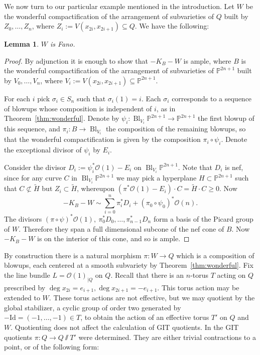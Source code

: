 \documentclass{amsart}
\newtheorem{lemma}[theorem]{Lemma}
\theoremstyle{definition}
\newcommand{\PP}{\mathbb{P}}
\DeclareMathOperator{\Bl}{Bl}
\begin{document}
We now turn to our particular example mentioned in the introduction. Let \(W\) be the wonderful compactification of the arrangement of subvarieties of \(Q\) built by \(Z_0,\dots,Z_n\), where \(Z_i := V(x_{2i},x_{2i+1}) \subseteq Q\). We have the following:
\begin{lemma}
\(W\) is Fano.
\end{lemma}
\begin{proof}
By adjunction it is enough to show that \(-K_B - W\) is ample, where \(B\) is the wonderful compactification of the arrangement of subvarieties of \(\PP^{2n+1}\) built by \(V_0,\dots,V_n\), where \(V_i := V(x_{2i},x_{2i+1}) \subseteq \PP^{2n+1}\).

For each \(i\) pick \(\sigma_i \in S_n\) such that \(\sigma_i(1) = i\). Each \(\sigma_i\) corresponds to a sequence of blowups whose composition is independent of \(i\), as in Theorem~\ref{thm:wonderful}. Denote by \( \psi_i: \Bl_{V_i} \PP^{2n+1} \to \PP^{2n+1}\) the first blowup of this sequence, and \(\pi_i: B \to \Bl_{V_i}\) the composition of the remaining blowups, so that the wonderful compactification is given by the composition \(\pi_i \circ \psi_i\). Denote the exceptional divisor of \(\psi_i\) by \(E_i\).

Consider the divisor \(D_i := \psi_i^* \mathcal{O}(1) - E_i\) on \(\Bl_{V_i} \PP^{2n+1}\). Note that \(D_i\) is nef, since for any curve \(C\) in \(\Bl_{V_i} \PP^{2n+1}\) we may pick a hyperplane \(H \subset \PP^{2n+1} \) such that \(C \not\subset \tilde{H}\) but \(Z_i \subset \tilde{H}\), whereupon \((\pi^* \mathcal{O}(1) - E_i) \cdot C = \tilde{H} \cdot C \ge 0\).
Now
\[
-K_B - W \sim  \sum_{i=0}^{n} \pi_i^* D_i + (\pi_0 \circ \psi_0)^* \mathcal{O}(n).
\]
The divisors \((\pi \circ \psi)^* \mathcal{O}(1), \ \pi_0^* D_0, \dots, \pi_{n-1}^* D_{n} \) form a basis of the Picard group of \(W\). Therefore they span a full dimensional subcone of the nef cone of \(B\). Now \(-K_B - W\) is on the interior of this cone, and so is ample.
\end{proof}
By construction there is a natural morphism \(\pi: W \to Q\) which is a composition of blowups, each centered at a smooth subvariety by Theorem~\ref{thm:wonderful}. Fix the line bundle \(L = \mathcal{O}(1)_{|Q} \) on \(Q\). Recall that there is an \(n\)-torus \(T\) acting on \(Q\) prescribed by \(\deg x_{2i} = e_{i+1}, \deg x_{2i+1} = -e_{i+1}\). This torus action may be extended to \(W\). These torus actions are not effective, but we may quotient by the global stabilizer, a cyclic group of order  two generated by \(-\text{Id} = (-1,\dots,-1) \in T\), to obtain the action of an effective torus \(T'\) on \(Q\) and \(W\). Quotienting does not affect the calculation of GIT quotients. In \cite{suess18-2} the GIT quotients \(\pi: Q \to Q \sslash T'\) were determined. They are either trivial contractions to a point, or of the following form:
\end{document}

